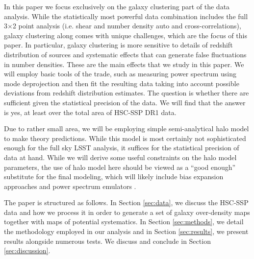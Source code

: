 \documentclass[a4paper,11pt]{article}
\begin{document}
In this paper we focus exclusively on the galaxy clustering part of the data analysis. While the statistically most powerful data combination includes the full 3$\times$2 point analysis (i.e. shear and number density auto and cross-correlations), galaxy clustering along comes with unique challenges, which are the focus of this paper. In particular, galaxy clustering is more sensitive to details of redshift distribution of sources and systematic effects that can generate false fluctuations in number densities. These are the main effects that we study in this paper. We will employ basic tools of the trade, such as measuring power spectrum using mode deprojection and then fit the resulting data taking into account possible deviations from redshift distribution estimates. The question is whether there are sufficient given the statistical precision of the data. We will find that the answer is yes, at least over the total area of HSC-SSP DR1 data.

Due to rather small area, we will be employing simple semi-analytical halo model to make theory predictions. While this model is most certainly not sophisticated enough for the full sky LSST analysis, it suffices for the statistical precision of data at hand. While we will derive some useful constraints on the halo model parameters, the use of halo model here should be viewed as a ``good enough'' substitute for the final modeling, which will likely include bias expansion approaches \cite{0902.0991,1402.5916,1611.09787} and power spectrum emulators \cite{1804.05865,1705.03388}.


The paper is structured as follows.  In Section \ref{sec:data}, we discuss the HSC-SSP data and how we process it in order to generate a set of galaxy over-density maps together with maps of potential systematics. In Section \ref{sec:methods}, we detail the methodology employed in our analysis and in Section \ref{sec:results}, we present results alongside numerous tests. We discuss and conclude in Section \ref{sec:discussion}.
\end{document}
